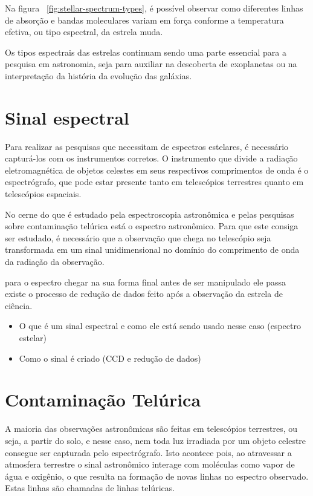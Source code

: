 Na figura ~\ref{fig:stellar-spectrum-types}, é possível observar como diferentes linhas de absorção e bandas moleculares variam em força conforme a temperatura efetiva, ou tipo espectral, da estrela muda.

Os tipos espectrais das estrelas continuam sendo uma parte essencial para a pesquisa em astronomia, seja para auxiliar na descoberta de exoplanetas ou na interpretação da história da evolução das galáxias. 

\section{Sinal espectral}

Para realizar as pesquisas que necessitam de espectros estelares, é necessário capturá-los com os instrumentos corretos. O instrumento que divide a radiação eletromagnética de objetos celestes em seus respectivos comprimentos de onda é o espectrógrafo, que pode estar presente tanto em telescópios terrestres quanto em telescópios espaciais.

No cerne do que é estudado pela espectroscopia astronômica e pelas pesquisas sobre contaminação telúrica está o espectro astronômico. Para que este consiga ser estudado, é necessário que a observação que chega no telescópio seja transformada em um sinal unidimensional no domínio do comprimento de onda da radiação da observação.

para o espectro chegar na sua forma final antes de ser manipulado ele passa existe o processo de redução de dados feito após a observação da estrela de ciência.
\begin{itemize}
\item O que é um sinal espectral e como ele está sendo usado nesse caso (espectro estelar)
    \item Como o sinal é criado (CCD e redução de dados)
\end{itemize}


\section{Contaminação Telúrica}

A maioria das observações astronômicas são feitas em telescópios terrestres, ou seja, a partir do solo, e nesse caso, nem toda luz irradiada por um objeto celestre consegue ser capturada pelo espectrógrafo. Isto acontece pois, ao atravessar a atmosfera terrestre o sinal astronômico interage com moléculas como vapor de água e oxigênio, o que resulta na formação de novas linhas no espectro observado. Estas linhas são chamadas de linhas telúricas.

